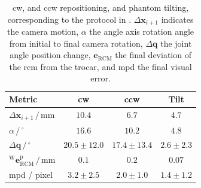 \begin{table}
\centering
\caption{\Acrfull{cw}, and \acrfull{ccw} repositioning, and phantom tilting, corresponding to the protocol in . $\Delta\mathbf{x}_{i+1}$ indicates the camera motion, $\alpha$ the angle axis rotation angle from initial to final camera rotation, $\Delta\mathbf{q}$ the joint angle position change, $\mathbf{e}_\text{RCM}$ the final deviation of the \acrshort{rcm} from the trocar, and \acrshort{mpd} the final visual error.}
\begin{tabular}{lccc}
    \toprule
     Metric & \acrshort{cw} & \acrshort{ccw} & Tilt \\
     \hline
     $\Delta\mathbf{x}_{i+1}\,/\,\text{mm}$ & $10.4$ & $6.7$ & $4.7$ \\
     \hline
     $\alpha\,/\,^\circ$ & $16.6$ & $10.2$ & $4.8$ \\
     \hline
     $\Delta\mathbf{q}\,/\,^\circ$ & $20.5\pm12.0$ & $17.4\pm13.4$ & $2.6 \pm 2.3$ \\
     \hline
     $^\text{W}\mathbf{e}^\text{p}_\text{RCM}\,/\,\text{mm}$& $0.1$ & $0.2$ & $0.07$ \\
     \hline
     \acrshort{mpd} / pixel & $3.2\pm2.5$ & $2.0\pm1.0$ & $1.4\pm1.2$ \\
     \bottomrule
\end{tabular}
\label{c2:tab:repositioning}
\end{table}
%    

